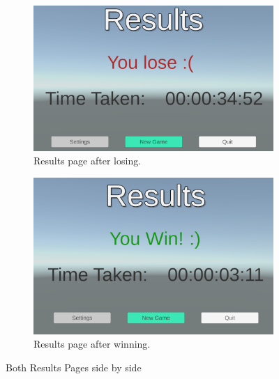 \begin{figure}[t]
    \centering
    \begin{subfigure}{0.4\textwidth}
        \includegraphics[width = \textwidth]{Images/ResultsLose.png}
            \caption{Results page after losing.}
            \label{Fig:ResultsLose}
    \end{subfigure}
    \hfill
    \centering
    \begin{subfigure}{0.4\textwidth}
        \includegraphics[width = \textwidth]{Images/ResultsWin.png}
            \caption{Results page after winning.}
            \label{Fig:ResultsWin}
    \end{subfigure}
    \caption{Both Results Pages side by side}
    \label{Fig:ResultsBoth}
\end{figure}

